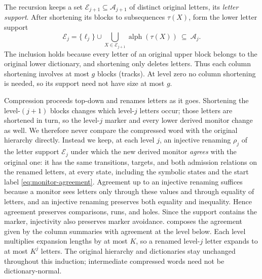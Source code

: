 The recursion keeps a set $\mathcal E_{j+1}\subseteq\mathcal A_{j+1}$ of distinct
original letters, its \emph{letter support}. After shortening its blocks to
subsequences $\tau(X)$, form the lower letter support
\begin{equation}\label{eq:descent-support}
 \mathcal E_j=\{\ell_j\}\cup\bigcup_{X\in\mathcal E_{j+1}}\operatorname{alph}(\tau(X))
 \ \subseteq\ \mathcal A_j.
\end{equation}
The inclusion holds because every letter of an original upper block
belongs to the original lower dictionary, and shortening only deletes
letters. Thus each column shortening involves at most $g$ blocks (tracks).
At level zero no column shortening is needed, so its support need not have
size at most $g$.

Compression proceeds top-down and renames letters as it goes. Shortening the
level-$(j+1)$ blocks changes which level-$j$ letters occur; those letters are
shortened in turn, so the level-$j$ marker and every lower derived monitor change
as well. We therefore never compare the compressed word with the original
hierarchy directly. Instead we keep, at each level $j$, an injective renaming
$\rho_j$ of the letter support $\mathcal E_j$ under which the new derived monitor
\emph{agrees} with the original one: it has the same transitions, targets, and both
admission relations on the renamed letters, at every state, including the symbolic
states and the start label \eqref{eq:monitor-agreement}. Agreement up to an injective
renaming suffices because a monitor sees letters only through these values and
through equality of letters, and an injective renaming preserves both equality and
inequality. Hence agreement preserves comparisons, runs, and holes. Since the support
contains the marker, injectivity also preserves marker avoidance.
 composes the agreement given by the column
summaries with agreement at the level below. Each level multiplies expansion lengths
by at most $K$, so a renamed level-$j$ letter expands to at most $K^j$ letters. The
original hierarchy and dictionaries stay unchanged throughout this induction;
intermediate compressed words need not be dictionary-normal.

